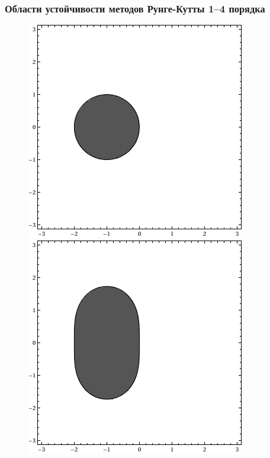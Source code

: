 \documentclass[professionalfonts,compress,unicode,aspectratio=169]{beamer}
\begin{document}
\begin{frame}\frametitle{Области устойчивости методов Рунге-Кутты 1--4 порядка}
\begin{figure}%
\includegraphics[height=.4\textheight]{rk1.png}%
\includegraphics[height=.4\textheight]{rk2.png}%


\end{figure}
\end{frame}
\end{document}
